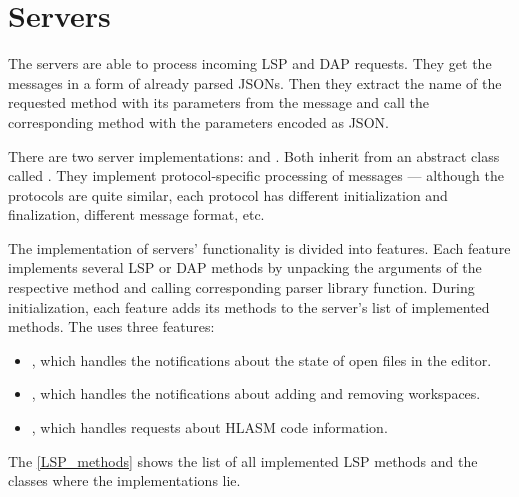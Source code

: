 \section{Servers}
The servers are able to process incoming LSP and DAP requests. They get the messages in a form of already parsed JSONs. Then they extract the name of the requested method with its parameters from the message and call the corresponding method with the parameters encoded as JSON.

There are two server implementations:  and . Both inherit from an abstract class called . They implement protocol-specific processing of messages --- although the protocols are quite similar, each protocol has different initialization and finalization, different message format, etc.

The implementation of servers' functionality is divided into features. Each feature implements several LSP or DAP methods by unpacking the arguments of the respective method and calling corresponding parser library function. During initialization, each feature adds its methods to the server's list of implemented methods. The  uses three features:
\begin{itemize}
	\item {}, which handles the notifications about the state of open files in the editor.
	\item {}, which handles the notifications about adding and removing workspaces.
	\item {}, which handles requests about HLASM code information.
\end{itemize}
The \cref{LSP_methods} shows the list of all implemented LSP methods and the classes where the implementations lie.

